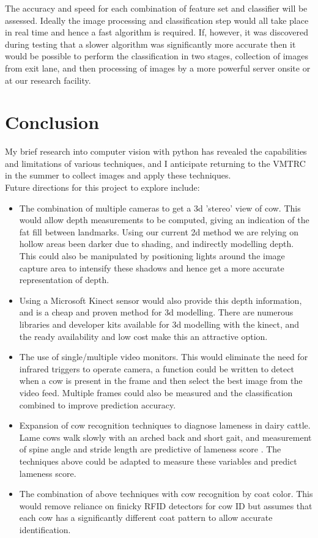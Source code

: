 \documentclass[11pt]{article}
\begin{document}
	The accuracy and speed for each combination of feature set and classifier will be assessed.
	Ideally the image processing and classification step would all take place in real time and hence a fast algorithm is required. 
	If, however, it was discovered during testing that a slower algorithm was significantly more accurate then it would be possible to perform the classification in two stages, collection of images from exit lane, and then processing of images by a more powerful server onsite or at our research facility. 

\newpage
\section{Conclusion}
	My brief research into computer vision with python has revealed the capabilities and limitations of various techniques, and I anticipate returning to the VMTRC in the summer to collect images and apply these techniques.\\

	Future directions for this project to explore include:
	\begin{itemize}
		\item The combination of multiple cameras to get a 3d 'stereo' view of cow. This would allow depth measurements to be computed, giving an indication of the fat fill between landmarks.
			Using our current 2d method we are relying on hollow areas been darker due to shading, and indirectly modelling depth.
			This could also be manipulated by positioning lights around the image capture area to intensify these shadows and hence get a more accurate representation of depth.
		\item Using a Microsoft Kinect sensor would also provide this depth information, and is a cheap and proven method for 3d modelling.
			There are numerous libraries and developer kits available for 3d modelling with the kinect, and the ready availability and low cost make this an attractive option.
		\item The use of single/multiple video monitors. This would eliminate the need for infrared triggers to operate camera, a function could be written to detect when a cow is present in the frame and then select the best image from the video feed. Multiple frames could also be measured and the classification combined to improve prediction accuracy.
		\item Expansion of cow recognition techniques to diagnose lameness in dairy cattle. Lame cows walk slowly with an arched back and short gait, and measurement of spine angle and stride length are predictive of lameness score \cite{Viazzi2013,Pluk2012}. The techniques above could be adapted to measure these variables and predict lameness score.
		\item The combination of above techniques with cow recognition by coat color. This would remove reliance on finicky RFID detectors for cow ID but assumes that each cow has a significantly different coat pattern to allow accurate identification.
	\end{itemize}
\end{document}
